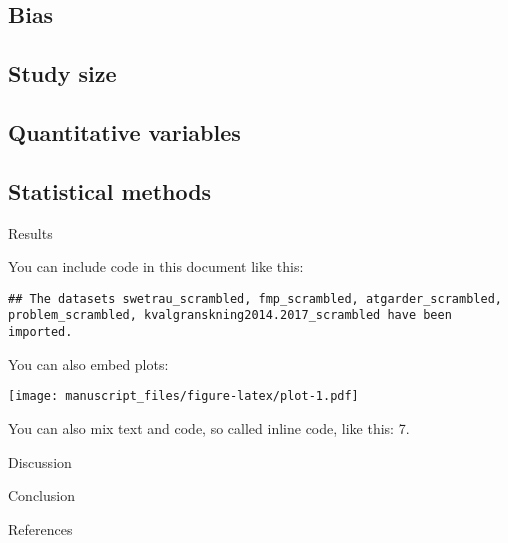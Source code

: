\documentclass[
]{article}
\begin{document}
\hypertarget{bias}{%
\subsection{Bias}\label{bias}}

\hypertarget{study-size}{%
\subsection{Study size}\label{study-size}}

\hypertarget{quantitative-variables}{%
\subsection{Quantitative variables}\label{quantitative-variables}}

\hypertarget{statistical-methods}{%
\subsection{Statistical methods}\label{statistical-methods}}

Results

You can include code in this document like this:

\begin{verbatim}
## The datasets swetrau_scrambled, fmp_scrambled, atgarder_scrambled, problem_scrambled, kvalgranskning2014.2017_scrambled have been imported.
\end{verbatim}

You can also embed plots:

\texttt{[image: manuscript\_files/figure-latex/plot-1.pdf]}

You can also mix text and code, so called inline code, like this: 7.

Discussion

Conclusion

References
\end{document}
